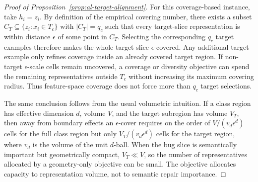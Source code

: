 \begin{tcolorbox}[
    colback=green!2!white,
    colframe=green!20!white,
    arc=3pt,
    boxrule=1pt,
    drop shadow,
    breakable
]
\begin{proof}[Proof of Proposition~\ref{prop:al-target-alignment}]
For this coverage-based instance, take $h_i=z_i$. By definition of the empirical covering number, there exists a subset $C_T\subseteq \{z_i:x_i\in T_c\}$ with $|C_T|=q_c$ such that every target-slice representation is within distance $\epsilon$ of some point in $C_T$. Selecting the corresponding $q_c$ target examples therefore makes the whole target slice $\epsilon$-covered. Any additional target example only refines coverage inside an already covered target region. If non-target $\epsilon$-scale cells remain uncovered, a coverage or diversity objective can spend the remaining representatives outside $T_c$ without increasing its maximum covering radius. Thus feature-space coverage does not force more than $q_c$ target selections.

The same conclusion follows from the usual volumetric intuition. If a class region has effective dimension $d$, volume $V$, and the target subregion has volume $V_T$, then away from boundary effects an $\epsilon$-cover requires on the order of $V/(v_d\epsilon^d)$ cells for the full class region but only $V_T/(v_d\epsilon^d)$ cells for the target region, where $v_d$ is the volume of the unit $d$-ball. When the bug slice is semantically important but geometrically compact, $V_T\ll V$, so the number of representatives allocated by a geometry-only objective can be small. The objective allocates capacity to representation volume, not to semantic repair importance.
\end{proof}
\end{tcolorbox}

